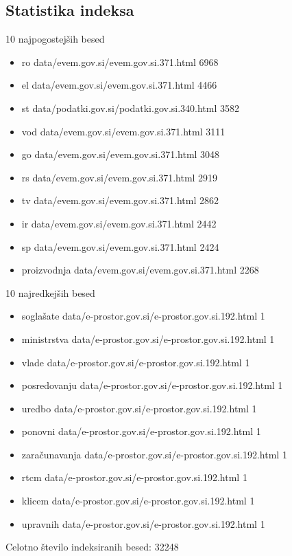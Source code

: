 \documentclass[runningheads]{llncs}
\begin{document}
\subsection{Statistika indeksa}
10 najpogostejših besed
\begin{itemize}
\item ro	data/evem.gov.si/evem.gov.si.371.html	6968
\item el	data/evem.gov.si/evem.gov.si.371.html	4466
\item st	data/podatki.gov.si/podatki.gov.si.340.html	3582
\item vod	data/evem.gov.si/evem.gov.si.371.html	3111
\item go	data/evem.gov.si/evem.gov.si.371.html	3048
\item rs	data/evem.gov.si/evem.gov.si.371.html	2919
\item tv	data/evem.gov.si/evem.gov.si.371.html	2862
\item ir	data/evem.gov.si/evem.gov.si.371.html	2442
\item sp	data/evem.gov.si/evem.gov.si.371.html	2424
\item proizvodnja	data/evem.gov.si/evem.gov.si.371.html	2268
\end{itemize}

10 najredkejših besed
\begin{itemize}
\item soglašate	data/e-prostor.gov.si/e-prostor.gov.si.192.html	1
\item ministrstva	data/e-prostor.gov.si/e-prostor.gov.si.192.html	1
\item vlade	data/e-prostor.gov.si/e-prostor.gov.si.192.html	1
\item posredovanju	data/e-prostor.gov.si/e-prostor.gov.si.192.html	1
\item uredbo	data/e-prostor.gov.si/e-prostor.gov.si.192.html	1
\item ponovni	data/e-prostor.gov.si/e-prostor.gov.si.192.html	1
\item zaračunavanja	data/e-prostor.gov.si/e-prostor.gov.si.192.html	1
\item rtcm	data/e-prostor.gov.si/e-prostor.gov.si.192.html	1
\item klicem	data/e-prostor.gov.si/e-prostor.gov.si.192.html	1
\item upravnih	data/e-prostor.gov.si/e-prostor.gov.si.192.html	1
\end{itemize}

Celotno število indeksiranih besed: 32248
\end{document}
